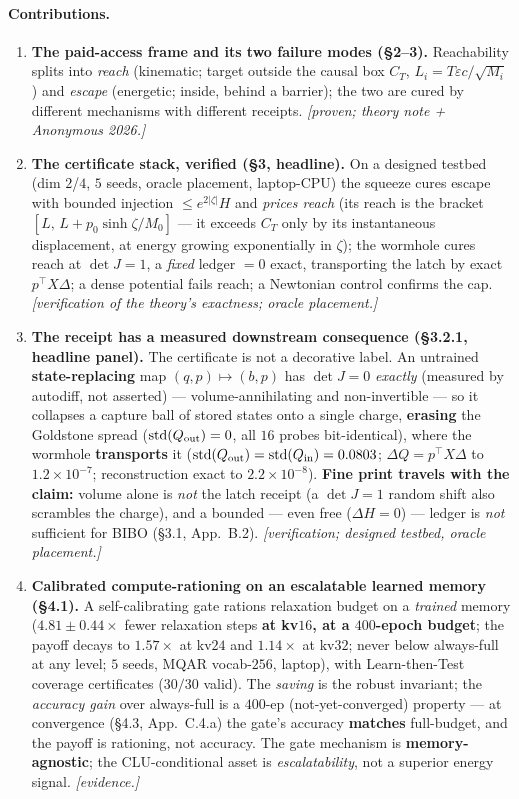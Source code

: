 \documentclass[11pt]{article}
\newcommand{\detJ}{\det J}
\begin{document}
\paragraph{Contributions.}
\begin{enumerate}\itemsep2pt
\item \textbf{The paid-access frame and its two failure modes (\S2--3).} Reachability splits into \emph{reach} (kinematic; target outside the causal box $C_T$, $L_i=T\varepsilon c/\sqrt{M_i}$) and \emph{escape} (energetic; inside, behind a barrier); the two are cured by different mechanisms with different receipts. \emph{[proven; theory note + Anonymous 2026.]}
\item \textbf{The certificate stack, verified (\S3, headline).} On a designed testbed (dim $2$/$4$, $5$ seeds, oracle placement, laptop-CPU) the squeeze cures escape with bounded injection $\le e^{2|\zeta|}H$ and \emph{prices reach} (its reach is the bracket $[L,\,L+p_0\sinh\zeta/M_0]$ --- it exceeds $C_T$ only by its instantaneous displacement, at energy growing exponentially in $\zeta$); the wormhole cures reach at $\detJ=1$, a \emph{fixed} ledger $=0$ exact, transporting the latch by exact $p^\top X\Delta$; a dense potential fails reach; a Newtonian control confirms the cap. \emph{[verification of the theory's exactness; oracle placement.]}
\item \textbf{The receipt has a measured downstream consequence (\S3.2.1, headline panel).} The certificate is not a decorative label. An untrained \textbf{state-replacing} map $(q,p)\mapsto(b,p)$ has $\detJ=0$ \emph{exactly} (measured by autodiff, not asserted) --- volume-annihilating and non-invertible --- so it collapses a capture ball of stored states onto a single charge, \textbf{erasing} the Goldstone spread ($\mathrm{std}(Q_{\rm out})=0$, all $16$ probes bit-identical), where the wormhole \textbf{transports} it ($\mathrm{std}(Q_{\rm out})=\mathrm{std}(Q_{\rm in})=0.0803$; $\Delta Q=p^\top X\Delta$ to $1.2{\times}10^{-7}$; reconstruction exact to $2.2{\times}10^{-8}$). \textbf{Fine print travels with the claim:} volume alone is \emph{not} the latch receipt (a $\detJ=1$ random shift also scrambles the charge), and a bounded --- even free ($\Delta H=0$) --- ledger is \emph{not} sufficient for BIBO (\S3.1, App.~B.2). \emph{[verification; designed testbed, oracle placement.]}
\item \textbf{Calibrated compute-rationing on an escalatable learned memory (\S4.1).} A self-calibrating gate rations relaxation budget on a \emph{trained} memory ($4.81\pm0.44\times$ fewer relaxation steps \textbf{at kv$16$, at a $400$-epoch budget}; the payoff decays to $1.57\times$ at kv$24$ and $1.14\times$ at kv$32$; never below always-full at any level; $5$ seeds, MQAR vocab-$256$, laptop), with Learn-then-Test coverage certificates ($30/30$ valid). The \emph{saving} is the robust invariant; the \emph{accuracy gain} over always-full is a $400$-ep (not-yet-converged) property --- at convergence (\S4.3, App.~C.4.a) the gate's accuracy \textbf{matches} full-budget, and the payoff is rationing, not accuracy. The gate mechanism is \textbf{memory-agnostic}; the CLU-conditional asset is \emph{escalatability}, not a superior energy signal. \emph{[evidence.]}

\end{enumerate}
\end{document}

